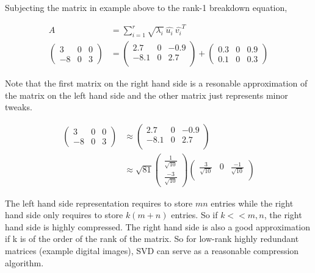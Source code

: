 \documentclass[11pt, a4paper]{article}
\begin{document}
Subjecting the matrix in example above to the rank-1 breakdown equation,

\begin{align*}
	A &= \sum_{i=1}^r \sqrt{\lambda_i}\ \hat{u_i}\ \hat{v_i}^T \\
	\begin{pmatrix}
	3    & 0 & 0    \\
	-8   & 0 & 3    
	\end{pmatrix} &= \begin{pmatrix}
	2.7  & 0 & -0.9 \\
	-8.1 & 0 & 2.7  \\
	\end{pmatrix} + \begin{pmatrix}
	0.3  & 0 & 0.9  \\
	0.1  & 0 & 0.3  
	\end{pmatrix}
\end{align*}

Note that the first matrix on the right hand side is a resonable approximation of the matrix on the left hand side and the other matrix just represents minor tweaks.

\begin{align*}
	\begin{pmatrix}
	3                   & 0 & 0                    \\
	-8                  & 0 & 3                    
	\end{pmatrix} &\approx \begin{pmatrix}
	2.7                 & 0 & -0.9                 \\
	-8.1                & 0 & 2.7                  \\
	\end{pmatrix} \\
	&\approx \sqrt{81} \begin{pmatrix}
	\frac{1}{\sqrt{10}} \\
	\frac{-3}{\sqrt{10}}
	\end{pmatrix} \begin{pmatrix}
	\frac{3}{\sqrt{10}} & 0 & \frac{-1}{\sqrt{10}} \\
	\end{pmatrix}
\end{align*}

The left hand side representation requires to store $mn$ entries while the right hand side only requires to store $k(m+n)$ entries. So if $k << m, n$, the right hand side is highly compressed. The right hand side is also a good approximation if k is of the order of the rank of the matrix. So for low-rank highly redundant matrices (example digital images), SVD can serve as a reasonable compression algorithm.
 
\end{document}
